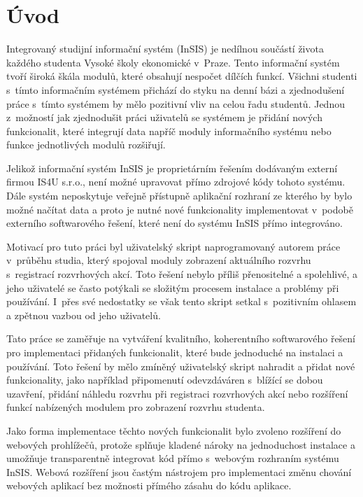 \chapter*{Úvod}

Integrovaný studijní informační systém (InSIS) je nedílnou součástí života každého studenta Vysoké školy ekonomické v~Praze. Tento informační systém tvoří široká škála modulů, které obsahují nespočet dílčích funkcí. Všichni studenti s~tímto informačním systémem přichází do styku na denní bázi a zjednodušení práce s~tímto systémem by mělo pozitivní vliv na celou řadu studentů. Jednou z~možností jak zjednodušit práci uživatelů se systémem je přidání nových funkcionalit, které integrují data napříč moduly informačního systému nebo funkce jednotlivých modulů rozšiřují. 

Jelikož informační systém InSIS je proprietárním řešením dodávaným externí firmou IS4U s.r.o., není možné upravovat přímo zdrojové kódy tohoto systému. Dále systém neposkytuje veřejně přístupně aplikační rozhraní ze kterého by bylo možné načítat data a proto je nutné nové funkcionality implementovat v~podobě externího softwarového řešení, které není do systému InSIS přímo integrováno. 

Motivací pro tuto práci byl uživatelský skript naprogramovaný autorem práce v~průběhu studia, který spojoval moduly zobrazení aktuálního rozvrhu s~registrací rozvrhových akcí. Toto řešení nebylo příliš přenositelné a spolehlivé, a jeho uživatelé se často potýkali se složitým procesem instalace a problémy při používání. I~přes své nedostatky se však tento skript setkal s~pozitivním ohlasem a zpětnou vazbou od jeho uživatelů.

Tato práce se zaměřuje na vytváření kvalitního, koherentního softwarového řešení pro implementaci přidaných funkcionalit, které bude jednoduché na instalaci a používání. Toto řešení by mělo zmíněný uživatelský skript nahradit a přidat nové funkcionality, jako například připomenutí odevzdáváren s~blížící se dobou uzavření, přidání náhledu rozvrhu při registraci rozvrhových akcí nebo rozšíření funkcí nabízených modulem pro zobrazení rozvrhu studenta. 

Jako forma implementace těchto nových funkcionalit bylo zvoleno rozšíření do webových prohlížečů, protože splňuje kladené nároky na jednoduchost instalace a umožňuje transparentně integrovat kód přímo s~webovým rozhraním systému InSIS. Webová rozšíření jsou častým nástrojem pro implementaci změnu chování webových aplikací bez možnosti přímého zásahu do kódu aplikace. 

